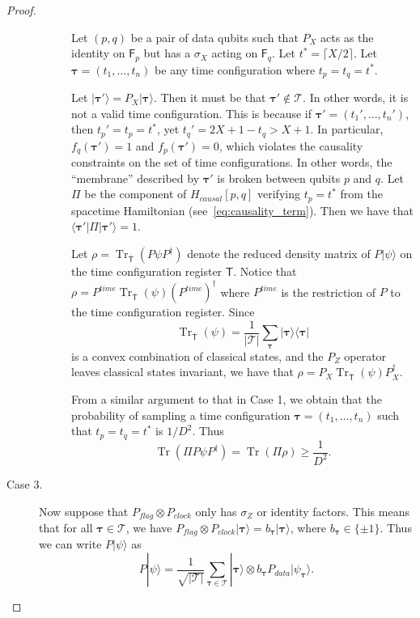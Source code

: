 \documentclass[11pt,letterpaper]{article}
\theoremstyle{definition}
\theoremstyle{remark}
\DeclareMathOperator{\Tr}{Tr}
\newcommand{\cT}{\mathcal T}
\renewcommand{\geq}{\geqslant}
\numberwithin{equation}{section}
\theoremstyle{definition}
\newcommand{\comp}[1]{\overline{#1}}
\newcommand{\ket}[1]{|#1\rangle}
\newcommand{\bra}[1]{\langle#1|}
\newcommand{\ketbra}[2]{|#1\rangle\! \langle #2|}
\newcommand{\sF}{{\mathsf{F}}}
\newcommand{\sT}{{\mathsf{T}}}
\newcommand{\timeconfig}{{\bm{\tau}}}
\begin{document}
\begin{proof}
\begin{description}
\begin{description}
    Let $(p,q)$ be a pair of data qubits such that $P_X$ acts as the identity on $\sF_p$ but has a $\sigma_X$ acting on $\sF_q$. Let $t^* = \lceil X/2 \rceil$. Let $\timeconfig = (t_1,\ldots,t_n)$ be any time configuration where $t_p = t_q = t^*$. 
    
  Let $\ket{\timeconfig'} = P_X \ket{\timeconfig}$. Then it must be that $\timeconfig' \notin \cT$. In other words, it is not a valid time configuration. This is because if $\timeconfig' = (t_1',\ldots,t_n')$, then $t_p' = t_p = t^*$, yet $t_q' = 2X + 1 - t_q > X + 1$. In particular, $f_q(\timeconfig') = 1$ and $f_p(\timeconfig') = 0$, which violates the causality constraints on the set of time configurations. In other words, the ``membrane'' described by $\timeconfig'$ is broken between qubits $p$ and $q$. Let $\Pi$ be the component of $H_{causal}[p,q]$ verifying $t_p = t^*$ from the spacetime Hamiltonian (see~\eqref{eq:causality_term}). Then we have that $\bra{\timeconfig'} \Pi \ket{\timeconfig'} = 1$. 
  
  Let $\rho = \Tr_{\comp{\sT}}(P \psi P^\dagger)$ denote the reduced density matrix of $P\ket{\psi}$ on the time configuration register $\sT$. Notice that $\rho = P^{time} \Tr_{\comp{\sT}}(\psi) (P^{time})^\dagger$ where $P^{time}$ is the restriction of $P$ to the time configuration register. Since
  \begin{equation}
    \Tr_{\comp{\sT}}(\psi) = \frac{1}{|\cT|} \sum_{\timeconfig} \ketbra{\timeconfig}{\timeconfig}
  \end{equation}
  is a convex combination of classical states, and the $P_Z$ operator leaves classical states invariant, we have that $\rho = P_X \Tr_{\comp{\sT}}(\psi) P_X^\dagger$. 
  
  From a similar argument to that in Case 1, we obtain that the probability of sampling a time configuration $\timeconfig = (t_1,\ldots,t_n)$ such that $t_p = t_q = t^*$ is $1/D^2$. Thus
  \begin{equation}
    \Tr(\Pi P \psi P^\dagger) = \Tr(\Pi \rho) \geq \frac{1}{D^2}.
  \end{equation}

  \end{description}
  
  \item[Case 3.] Now suppose that $P_{flag} \otimes P_{clock}$ only has $\sigma_Z$ or identity factors. This means that for all $\timeconfig \in \cT$, we have $P_{flag} \otimes P_{clock} \ket{\timeconfig} = b_\timeconfig \ket{\timeconfig}$, where $b_\timeconfig \in \{\pm 1\}$. Thus we can write $P \ket{\psi}$ as
  \begin{equation}
    P \ket{\psi} = \frac{1}{\sqrt{|\cT|}} \sum_{\timeconfig \in \cT} \ket{\timeconfig} \otimes b_\timeconfig P_{data} \ket{\psi_\timeconfig}.
  \end{equation}


\end{description}
\end{proof}
\end{document}
